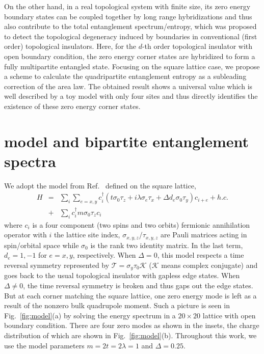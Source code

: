\documentclass[doublecol]{epl2} %
\begin{document}
On the other hand, in a real topological system with finite size, its zero energy boundary states can be coupled together by long range hybridizations and thus also contribute to the total entanglement spectrum/entropy, which was proposed to detect the topological degeneracy induced by boundaries in conventional (first order) topological insulators. \cite{Wang_PRB_2015} Here, for the $d$-th order topological insulator with open boundary condition, the zero energy corner states are hybridized to form a fully multipartite entangled state. Focusing on the square lattice case, we propose a scheme to calculate the quadripartite entanglement entropy as a subleading correction of the area law. The obtained result shows a universal value which is well described by a toy model with only four sites and thus directly identifies the existence of these zero energy corner states. 

\section{model and bipartite entanglement spectra}

We adopt the model from Ref.~\cite{Schindler_SA_2018} defined on the square lattice,
\begin{eqnarray} \label{eq:model}
H &=& \sum_{i}\sum_{e=x,y} c_i^\dag\left( t\sigma_0\tau_z + i\lambda \sigma_e\tau_x + \Delta d_e \sigma_0\tau_y \right)c_{i+e} + h.c. \nonumber\\ 
&+& \sum_i c_i^\dag m\sigma_0 \tau_z c_i
\end{eqnarray}
where $c_i$ is a four component (two spins and two orbits) fermionic annihilation operator with $i$ the lattice site index, $\sigma_{x,y,z}$/$\tau_{x,y,z}$ are Pauli matrices acting in spin/orbital space while $\sigma_0$ is the rank two identity matrix. In the last term, $d_e=1,-1$ for $e=x,y$, respectively. When $\Delta=0$, this model respects a time reversal symmetry represented by $\mathcal{T}=\sigma_y\tau_0\mathcal{K}$ ($\mathcal{K}$ means complex conjugate) and goes back to the usual topological insulator with gapless edge states. \cite{Qi_PRB_2008} When $\Delta\ne0$, the time reversal symmetry is broken and thus gaps out the edge states. But at each corner matching the square lattice, one zero energy mode is left as a result of the nonzero bulk quadrupole moment. \cite{Benalcazar_S_2017} Such a picture is seen in Fig.~\ref{fig:model}(a) by solving the energy spectrum in a $20\times20$ lattice with open boundary condition. There are four zero modes as shown in the insets, the charge distribution of which are shown in Fig.~\ref{fig:model}(b). Throughout this work, we use the model parameters $m=2t=2\lambda=1$ and $\Delta=0.25$. 
\end{document}
